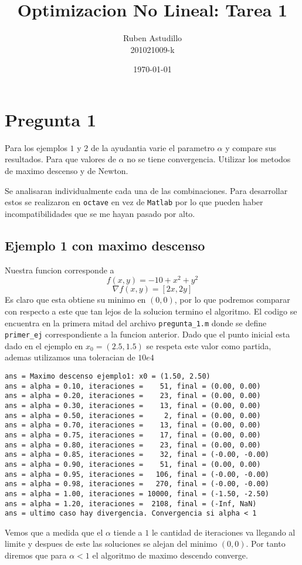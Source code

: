 \documentclass[letterpaper]{article}
\begin{document}
\title{Optimizacion No Lineal: Tarea 1}
\author{Ruben Astudillo \\ 201021009-k}
\date{\today}
\maketitle

\section*{Pregunta 1}
\noindent Para los ejemplos \(1\) y \(2\) de la ayudantia varie el
parametro \(\alpha\) y compare sus resultados. Para que valores de
\(\alpha\) no se tiene convergencia. Utilizar los metodos de maximo
descenso y de Newton.
\newline

Se analisaran individualmente cada una de las combinaciones. Para
desarrollar estos se realizaron en \texttt{octave} en vez de
\texttt{Matlab} por lo que pueden haber incompatibilidades que se me
hayan pasado por alto.󠀿

\subsection*{Ejemplo 1 con maximo descenso}
\noindent Nuestra funcion corresponde a
\[ f(x,y) = -10 + x^2 + y^2\]
\[ \nabla f (x,y) = [2 x , 2 y ] \]
Es claro que esta obtiene su minimo en \((0,0)\), por lo que podremos
comparar con respecto a este que tan lejos de la solucion termino el
algoritmo. El codigo se encuentra en la primera mitad del archivo
\texttt{pregunta\_1.m} donde se define \texttt{primer\_ej}
correspondiente a la funcion anterior. Dado que el punto inicial esta
dado en el ejemplo en \(x_0 = (2.5, 1.5)\) se respeta este valor como
partida, ademas utilizamos una toleracian de \(10e4\)
\begin{verbatim}
ans = Maximo descenso ejemplo1: x0 = (1.50, 2.50)
ans = alpha = 0.10, iteraciones =    51, final = (0.00, 0.00)
ans = alpha = 0.20, iteraciones =    23, final = (0.00, 0.00)
ans = alpha = 0.30, iteraciones =    13, final = (0.00, 0.00)
ans = alpha = 0.50, iteraciones =     2, final = (0.00, 0.00)
ans = alpha = 0.70, iteraciones =    13, final = (0.00, 0.00)
ans = alpha = 0.75, iteraciones =    17, final = (0.00, 0.00)
ans = alpha = 0.80, iteraciones =    23, final = (0.00, 0.00)
ans = alpha = 0.85, iteraciones =    32, final = (-0.00, -0.00)
ans = alpha = 0.90, iteraciones =    51, final = (0.00, 0.00)
ans = alpha = 0.95, iteraciones =   106, final = (-0.00, -0.00)
ans = alpha = 0.98, iteraciones =   270, final = (-0.00, -0.00)
ans = alpha = 1.00, iteraciones = 10000, final = (-1.50, -2.50)
ans = alpha = 1.20, iteraciones =  2108, final = (-Inf, NaN)
ans = ultimo caso hay divergencia. Convergencia si alpha < 1
\end{verbatim}
Vemos que a medida que el \(\alpha\) tiende a \(1\) le cantidad de
iteraciones va llegando al limite y despues de este las soluciones se
alejan del minimo \((0,0)\). Por tanto diremos que para \(\alpha < 1\)
el algoritmo de maximo descendo converge.
\end{document}
